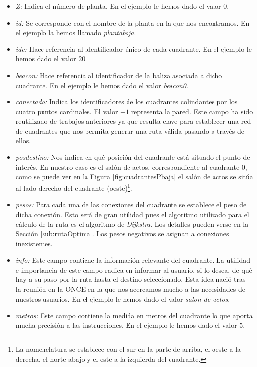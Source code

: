 \begin{itemize}
	\item \textit{Z:} Indica el número de planta. En el ejemplo le hemos dado el valor $0$.
	
	\item \textit{id:} Se corresponde con el nombre de la planta en la que nos encontramos. En el ejemplo la hemos llamado \textit{plantabaja}.
	
	\item \textit{idc:} Hace referencia al identificador único de cada cuadrante. En el ejemplo le hemos dado el valor $20$.
	
	\item \textit{beacon:} Hace referencia al identificador de la baliza asociada a dicho cuadrante. En el ejemplo le hemos dado el valor \textit{beacon0}.
	
	\item \textit{conectado:} Indica los identificadores de los cuadrantes colindantes por los cuatro puntos cardinales. El valor $-1$ representa la pared. Este campo ha sido reutilizado de trabajos anteriores ya que resulta clave para establecer una red de cuadrantes que nos permita generar una ruta válida pasando a través de ellos.
	
	\item \textit{posdestino:} Nos indica en qué posición del cuadrante está situado el punto de interés. En nuestro caso es el salón de actos, correspondiente al cuadrante $0$, como se puede ver en la Figura \ref{fig:cuadrantesPbaja} el salón de actos se sitúa al lado derecho del cuadrante (oeste)\footnote{La nomenclatura se establece con el sur en la parte de arriba, el oeste a la derecha, el norte abajo y el este a la izquierda del cuadrante.}.
	
	\item \textit{pesos:} Para cada una de las conexiones del cuadrante se establece el peso de dicha conexión. Esto será de gran utilidad pues el algoritmo utilizado para el cálculo de la ruta es el algoritmo de \textit{Dijkstra}. Los detalles pueden verse en la Sección \ref{sub:rutaOptima}. Los pesos negativos se asignan a conexiones inexistentes.
	
	\item \textit{info:} Este campo contiene la información relevante del cuadrante. La utilidad e importancia de este campo radica en informar al usuario, si lo desea, de qué hay a su paso por la ruta hasta el destino seleccionado. Esta idea nació tras la reunión en la ONCE en la que nos acercamos mucho a las necesidades de nuestros usuarios. En el ejemplo le hemos dado el valor \textit{salon de actos}.
	
	\item \textit{metros:} Este campo contiene la medida en metros del cuadrante lo que aporta mucha precisión a las instrucciones. En el ejemplo le hemos dado el valor $5$.
\end{itemize}




